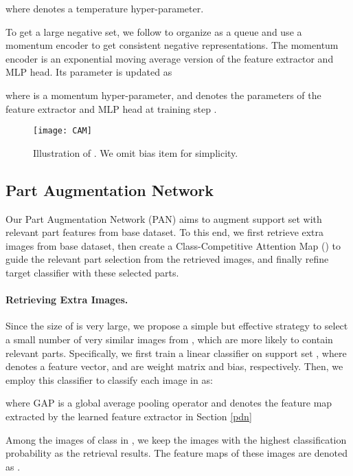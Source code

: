 \documentclass{article}
\begin{document}
where  denotes a temperature hyper-parameter.


To get a large negative set, we follow \cite{He2020MomentumCF} to organize  as a queue and use a momentum encoder to get consistent negative representations. The momentum encoder is an exponential moving average version of the feature extractor and MLP head. Its parameter  is updated as

where  is a momentum hyper-parameter, and  denotes the parameters of the feature extractor and MLP head at training step .

\begin{figure}[t]
    \centering
    \texttt{[image: CAM]}
    \caption{Illustration of . We omit bias item for simplicity.}
    \label{fig:CAM}
\end{figure}

\subsection{Part Augmentation Network} \label{pan}


Our Part Augmentation Network (PAN) aims to augment support set with relevant part features from base dataset. To this end, we first retrieve extra images from base dataset, then create a Class-Competitive Attention Map () to guide the relevant part selection from the retrieved images, and finally refine target classifier with these selected parts.

\paragraph{Retrieving Extra Images.} Since the size of  is very large, we propose a simple but effective strategy to select a small number of very similar images from , which are more likely to contain relevant parts. Specifically, we first train a linear classifier 
on support set , where  denotes a feature vector,  and  are weight matrix and bias, respectively. Then, we employ this classifier to classify each image in  as:

where GAP is a global average pooling operator and  denotes the feature map extracted by the learned feature extractor  in Section \ref{pdn}


Among the images of class  in , we keep the  images with the highest classification probability as the retrieval results. The feature maps of these  images are denoted as .
\end{document}
